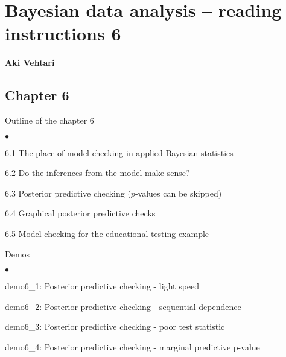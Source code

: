 \documentclass[a4paper,11pt,english]{article}
\begin{document}
\thispagestyle{empty}

\section*{Bayesian data analysis -- reading instructions 6} 
\smallskip
{\bf Aki Vehtari}
\smallskip

\subsection*{Chapter 6}

Outline of the chapter 6
\begin{list}{$\bullet$}{\parsep=0pt\itemsep=2pt}
\item 6.1 The place of model checking in applied Bayesian statistics
\item 6.2 Do the inferences from the model make sense?
\item 6.3 Posterior predictive checking ($p$-values can be skipped)
\item 6.4 Graphical posterior predictive checks
\item 6.5 Model checking for the educational testing example
\end{list}

Demos
\begin{list}{$\bullet$}{\parsep=0pt\itemsep=2pt}
\item demo6\_1: Posterior predictive checking - light speed
\item demo6\_2: Posterior predictive checking - sequential dependence
\item demo6\_3: Posterior predictive checking - poor test statistic
\item demo6\_4: Posterior predictive checking - marginal predictive p-value
\end{list}
\end{document}
